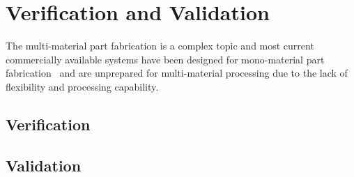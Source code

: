 \chapter{Verification and Validation}%
\label{ch:verif-valid}
  The multi-material part fabrication is a complex topic and most current
  commercially available systems have been designed for mono-material part
  fabrication~\cite{wohlers2011wohlers} and are unprepared for multi-material
  processing due to the lack of flexibility and processing capability.
%
\section{Verification}%
\label{sec:verification}
% 
%
\section{Validation}%
\label{sec:validation}
% 
%
%
